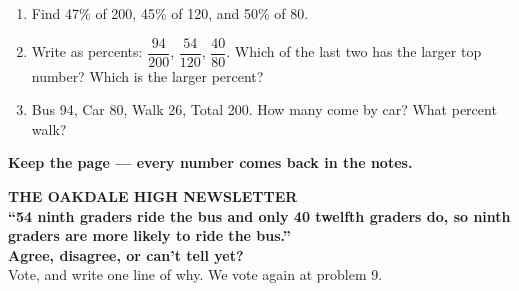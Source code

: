 \documentclass[aspectratio=169, 11pt]{beamer}
\begin{document}
\begin{frame}[t, plain]
  \vspace{0.2cm}
  \begin{center}
    \begin{minipage}{0.86\textwidth}
      \begin{enumerate}\setlength{\itemsep}{7pt}
        \item Find 47\% of 200, 45\% of 120, and 50\% of 80.
        \item Write as percents: $\dfrac{94}{200}$, $\dfrac{54}{120}$, $\dfrac{40}{80}$. Which of
              the last two has the larger top number? Which is the larger percent?
        \item Bus 94, Car 80, Walk 26, Total 200. How many come by car? What percent walk?
      \end{enumerate}
    \end{minipage}
  \end{center}
  \vspace{0.2cm}
  \begin{center}
    {\color{cerulean}\bfseries Keep the page --- every number comes back in the notes.}
  \end{center}
\end{frame}

{
\begin{frame}[plain]
  \vspace{1.2cm}
  \begin{center}
    {\color{frostmid}\bfseries\small THE OAKDALE HIGH NEWSLETTER}\\[0.7cm]
    {\color{white}\bfseries\Large ``54 ninth graders ride the bus and only 40 twelfth graders do,
    so ninth graders are more likely to ride the bus.''}\\[0.8cm]
    {\color{goldacc}\bfseries\large Agree, disagree, or can't tell yet?}\\[0.5cm]
    {\color{frostmid}\small Vote, and write one line of why. We vote again at problem 9.}
  \end{center}
\end{frame}
}
\end{document}
